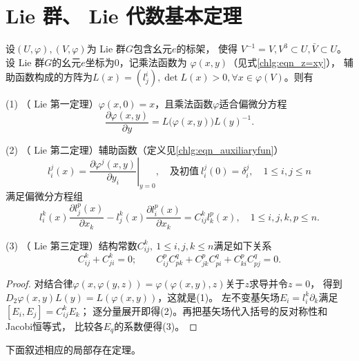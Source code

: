 \section{Lie 群、 Lie 代数基本定理}

\begin{theorem}
    设$(U, \varphi),(V, \varphi)$为 Lie 群$G$包含幺元$e$的标架，
    使得 $V^{-1}=V, V^3 \subset U, \bar{V} \subset U$。
    设 Lie 群$G$的幺元$e$坐标为$0$，记乘法函数为 $\varphi(x, y)$（见式\eqref{chlg:eqn_z=xy}），
    辅助函数构成的方阵为$L(x)=\left(l_j^i\right), \det  L(x)>0,
    \forall x \in \varphi(V)$。则有

    \noindent
    (1) （ Lie 第一定理）$\varphi(x, 0)=x$，且乘法函数$\varphi$适合偏微分方程
    \begin{equation}
        \frac{\partial \varphi(x, y)}{\partial y}=L\bigl(\varphi(x, y)\bigr) L(y)^{-1} .
    \end{equation}

    \noindent
    (2) （ Lie 第二定理）辅助函数（定义见\eqref{chlg:eqn_auxiliaryfun}）
    \begin{equation}
        l_i^j(x)=\left.\frac{\partial \varphi^j(x, y)}{\partial y_i}\right|_{y=0},
        \quad \text{及初值}\ l_i^j(0)=\delta_i^j,
        \quad 1 \leqslant i, j \leqslant n
    \end{equation}
    满足偏微分方程组
    \begin{equation}
        l_i^k(x) \frac{\partial l_j^p(x)}{\partial x_k}-l_j^k(x)
        \frac{\partial l_i^p(x)}{\partial x_k}= C_{i j}^k l_k^p(x),
        \quad 1 \leqslant i, j,k, p \leqslant n .
    \end{equation}

    \noindent
    (3) （ Lie 第三定理）结构常数$C_{i j}^k,\ 1 \leqslant i, j, k \leqslant n$满足如下关系
    \begin{equation}\label{chlg:eqn_LC-Jacobi}
        C_{i j}^k+C_{j i}^k=0; \qquad
        C_{i j}^p C_{p k}^q +C_{j k}^p C_{p i}^q +C_{k i}^p C_{p j}^q=0 .
    \end{equation}

\end{theorem}

\begin{proof}
对结合律$\varphi(x,\varphi(y,z))=\varphi(\varphi(x,y),z)$关于$z$求导并令$z=0$，
得到$D_2\varphi(x,y)L(y)=L(\varphi(x,y))$，这就是(1)。
左不变基矢场$E_i=l_i^k\partial_k$满足$[E_i,E_j]=C_{ij}^kE_k$；
逐分量展开即得(2)。再把基矢场代入括号的反对称性和Jacobi恒等式，
比较各$E_q$的系数便得(3)。
\end{proof}
下面叙述相应的局部存在定理。

